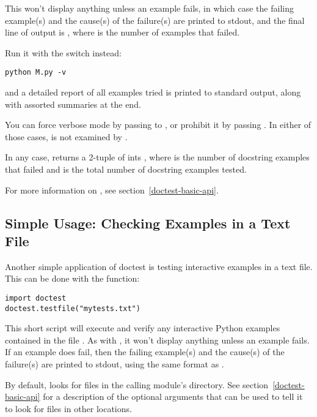 This won't display anything unless an example fails, in which case the
failing example(s) and the cause(s) of the failure(s) are printed to stdout,
and the final line of output is
, where  is the
number of examples that failed.

Run it with the  switch instead:

\begin{verbatim}
python M.py -v
\end{verbatim}

and a detailed report of all examples tried is printed to standard
output, along with assorted summaries at the end.

You can force verbose mode by passing  to
, or
prohibit it by passing .  In either of those cases,
 is not examined by .

In any case,  returns a 2-tuple of ints
, where
 is the number of docstring examples that failed
and  is the total number of docstring examples tested.

For more information on , see
section~\ref{doctest-basic-api}.

\subsection{Simple Usage: Checking Examples in a Text
            File\label{doctest-simple-testfile}}

Another simple application of doctest is testing interactive examples
in a text file.  This can be done with the 
function:

\begin{verbatim}
import doctest
doctest.testfile("mytests.txt")
\end{verbatim}

This short script will execute and verify any interactive Python
examples contained in the file .  As with
, it won't display anything unless an example
fails.  If an example does fail, then the failing example(s) and the
cause(s) of the failure(s) are printed to stdout, using the same
format as .

By default,  looks for files in the calling
module's directory.  See section~\ref{doctest-basic-api} for a
description of the optional arguments that can be used to tell it to
look for files in other locations.


